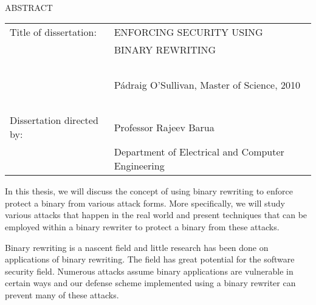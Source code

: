 
\hbox{\ }

\renewcommand{\baselinestretch}{1}
\small \normalsize

\begin{center}
\large{{ABSTRACT}} 

\vspace{3em} 

\end{center}
\hspace{-.15in}
\begin{tabular}{ll}
Title of dissertation:    & {\large  ENFORCING SECURITY USING}\\
&				      {\large  BINARY REWRITING} \\
\ \\
&                          {\large  P\'{a}draig O'Sullivan, Master of Science, 2010} \\
\ \\
Dissertation directed by: & {\large  Professor Rajeev Barua} \\
&  				{\large	 Department of Electrical and Computer Engineering} \\
\end{tabular}

\vspace{3em}

\renewcommand{\baselinestretch}{2}
\large \normalsize

In this thesis, we will discuss the concept of using binary rewriting to enforce protect a binary
from various attack forms. More specifically, we will study various attacks that happen in the real
world and present techniques that can be employed within a binary rewriter to protect a binary from
these attacks.

Binary rewriting is a nascent field and little research has been done on applications of binary
rewriting. The field has great potential for the software security field. Numerous attacks assume
binary applications are vulnerable in certain ways and our defense scheme implemented using a binary
rewriter can prevent many of these attacks.
